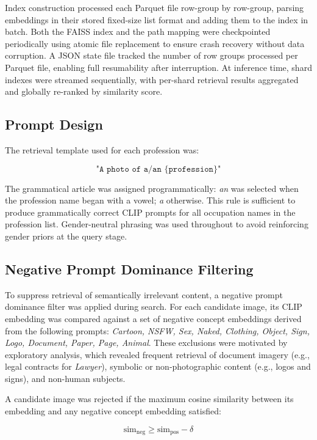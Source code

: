 Index construction processed each Parquet file row-group by row-group,
parsing embeddings in their stored fixed-size list format and adding them
to the index in batch. Both the FAISS index and the path mapping were
checkpointed periodically using atomic file replacement to ensure crash
recovery without data corruption. A JSON state file tracked the number of
row groups processed per Parquet file, enabling full resumability after
interruption. At inference time, shard indexes were streamed sequentially,
with per-shard retrieval results aggregated and globally re-ranked by
similarity score.

\subsection{Prompt Design}

The retrieval template used for each profession was:

\[
\texttt{"A photo of a/an \{profession\}"}
\]

The grammatical article was assigned programmatically: \textit{an} was
selected when the profession name began with a vowel; \textit{a} otherwise.
This rule is sufficient to produce grammatically correct CLIP prompts for
all occupation names in the profession list. Gender-neutral phrasing was
used throughout to avoid reinforcing gender priors at the query stage.

\subsection{Negative Prompt Dominance Filtering}

To suppress retrieval of semantically irrelevant content, a negative prompt
dominance filter was applied during search. For each candidate image, its
CLIP embedding was compared against a set of negative concept embeddings
derived from the following prompts: \emph{Cartoon, NSFW, Sex, Naked,
	Clothing, Object, Sign, Logo, Document, Paper, Page, Animal}. These
exclusions were motivated by exploratory analysis, which revealed frequent
retrieval of document imagery (e.g., legal contracts for \emph{Lawyer}),
symbolic or non-photographic content (e.g., logos and signs), and
non-human subjects.

A candidate image was rejected if the maximum cosine similarity between its
embedding and any negative concept embedding satisfied:

\[
\text{sim}_{\text{neg}} \geq \text{sim}_{\text{pos}} - \delta
\]

